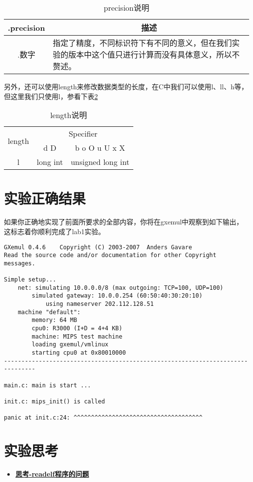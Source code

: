 \begin{table}[h]
  \centering
  \begin{tabular}{cp{10cm}}
  \toprule
  .precision& \multicolumn{1}{c}{描述}\\
  \midrule
  .数字& 指定了精度，不同标识符下有不同的意义，但在我们实验的版本中这个值只进行计算而没有具体意义，所以不赘述。\\
  \bottomrule
  \end{tabular}
  \caption{precision说明\label{tab:precision}}
\end{table}

另外，还可以使用length来修改数据类型的长度，在C中我们可以使用l、ll、h等，但这里我们只使用l，参看下表\ref{tab:length}

\begin{table}[h]
  \centering
  \begin{tabular}{ccc}
  \toprule
  \multirow{2}{*}{length}& \multicolumn{2}{c}{Specifier}\\
  \cline{2-3}
  &d D      & b o O u U x X\\
  \midrule
  l& long int & unsigned long int\\
  \bottomrule
  \end{tabular}
  \caption{length说明\label{tab:length}}
\end{table}

\section{实验正确结果}
如果你正确地实现了前面所要求的全部内容，你将在gxemul中观察到如下输出，这标志着你顺利完成了lab1实验。

\begin{verbatim}
GXemul 0.4.6    Copyright (C) 2003-2007  Anders Gavare
Read the source code and/or documentation for other Copyright messages.

Simple setup...
    net: simulating 10.0.0.0/8 (max outgoing: TCP=100, UDP=100)
        simulated gateway: 10.0.0.254 (60:50:40:30:20:10)
            using nameserver 202.112.128.51
    machine "default":
        memory: 64 MB
        cpu0: R3000 (I+D = 4+4 KB)
        machine: MIPS test machine
        loading gxemul/vmlinux
        starting cpu0 at 0x80010000
-------------------------------------------------------------------------------

main.c: main is start ...

init.c: mips_init() is called

panic at init.c:24: ^^^^^^^^^^^^^^^^^^^^^^^^^^^^^^^^^^^^^
\end{verbatim}

\section{实验思考}
\begin{itemize}
\item \hyperref[think-endian]{\textbf{\textcolor{baseB}{思考-readelf程序的问题}}}
\end{itemize}


